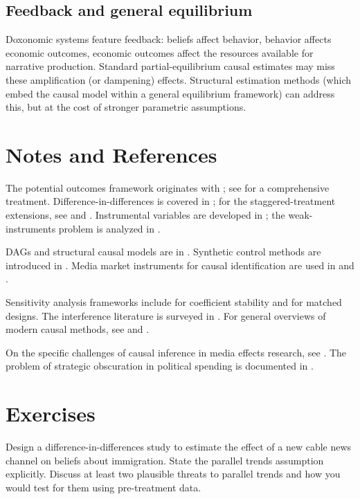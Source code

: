 \subsection{Feedback and general equilibrium}

Doxonomic systems feature feedback: beliefs affect behavior, behavior affects economic outcomes, economic outcomes affect the resources available for narrative production.
Standard partial-equilibrium causal estimates may miss these amplification (or dampening) effects.
Structural estimation methods (which embed the causal model within a general equilibrium framework) can address this, but at the cost of stronger parametric assumptions.

\section{Notes and References}
\label{sec:ch16-notes}

The potential outcomes framework originates with \textcite{rubin2005}; see \textcite{imbens2015} for a comprehensive treatment.
Difference-in-differences is covered in \textcite{angrist2009}; for the staggered-treatment extensions, see \textcite{callaway2021} and \textcite{dechaisemartin2020}.
Instrumental variables are developed in \textcite{angrist2009}; the weak-instruments problem is analyzed in \textcite{staiger1997}.

DAGs and structural causal models are in \textcite{pearl2009}.
Synthetic control methods are introduced in \textcite{abadie2010}.
Media market instruments for causal identification are used in \textcite{gentzkow2010} and \textcite{dellavigna2007}.

Sensitivity analysis frameworks include \textcite{oster2019} for coefficient stability and \textcite{rosenbaum2002} for matched designs.
The interference literature is surveyed in \textcite{hudgens2008}.
For general overviews of modern causal methods, see \textcite{athey2017} and \textcite{morgan2015}.

On the specific challenges of causal inference in media effects research, see \textcite{dellavigna2010}.
The problem of strategic obscuration in political spending is documented in \textcite{mayer2016}.

\section{Exercises}

\begin{exercise}
Design a difference-in-differences study to estimate the effect of a new cable news channel on beliefs about immigration.
State the parallel trends assumption explicitly.
Discuss at least two plausible threats to parallel trends and how you would test for them using pre-treatment data.
\end{exercise}

